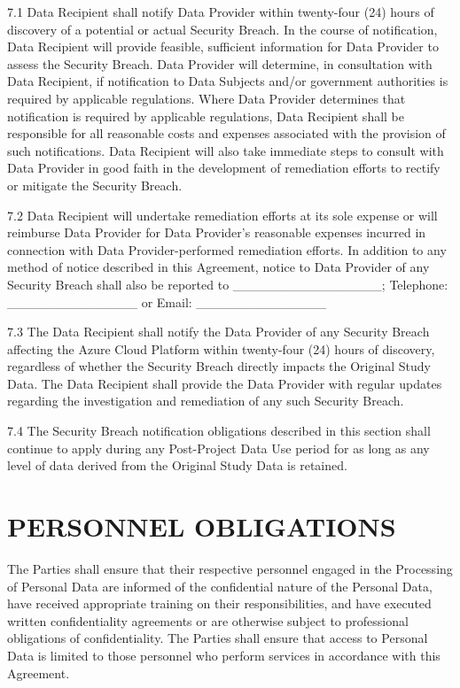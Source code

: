 \documentclass[12pt,letterpaper]{article}
\newcommand{\added}[1]{\textcolor{addcolor}{#1}}
\begin{document}
7.1 Data Recipient shall notify Data Provider within twenty-four (24) hours of discovery of a potential or actual Security Breach. In the course of notification, Data Recipient will provide feasible, sufficient information for Data Provider to assess the Security Breach. Data Provider will determine, in consultation with Data Recipient, if notification to Data Subjects and/or government authorities is required by applicable regulations. Where Data Provider determines that notification is required by applicable regulations, Data Recipient shall be responsible for all reasonable costs and expenses associated with the provision of such notifications. Data Recipient will also take immediate steps to consult with Data Provider in good faith in the development of remediation efforts to rectify or mitigate the Security Breach.

7.2 Data Recipient will undertake remediation efforts at its sole expense or will reimburse Data Provider for Data Provider's reasonable expenses incurred in connection with Data Provider-performed remediation efforts. In addition to any method of notice described in this Agreement, notice to Data Provider of any Security Breach shall also be reported to \_\_\_\_\_\_\_\_\_\_\_\_\_\_\_\_; Telephone: \_\_\_\_\_\_\_\_\_\_\_\_\_\_ or Email: \_\_\_\_\_\_\_\_\_\_\_\_\_\_

\added{7.3 The Data Recipient shall notify the Data Provider of any Security Breach affecting the Azure Cloud Platform within twenty-four (24) hours of discovery, regardless of whether the Security Breach directly impacts the Original Study Data. The Data Recipient shall provide the Data Provider with regular updates regarding the investigation and remediation of any such Security Breach.}

\added{7.4 The Security Breach notification obligations described in this section shall continue to apply during any Post-Project Data Use period for as long as any level of data derived from the Original Study Data is retained.}

\section{PERSONNEL OBLIGATIONS}

The Parties shall ensure that their respective personnel engaged in the Processing of Personal Data are informed of the confidential nature of the Personal Data, have received appropriate training on their responsibilities, and have executed written confidentiality agreements or are otherwise subject to professional obligations of confidentiality. The Parties shall ensure that access to Personal Data is limited to those personnel who perform services in accordance with this Agreement.
\end{document}
